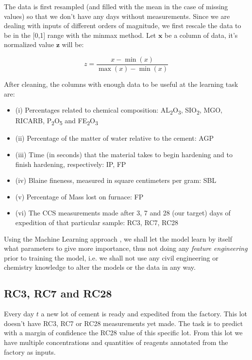 \documentclass[a4paper]{article}
\begin{document}
The data is first resampled (and filled with the mean in the case of missing values) so that we don't have any days without measurements. 
Since we are dealing with inputs of different orders of magnitude, we first rescale the data to be in the [0,1] range with the minmax method. Let  \(\textbf{x}\) be a column of data, it's 
normalized value \(\textbf{z}\) will be:


\begin{equation}
z=\frac{x-\min (x)}{\max (x)-\min (x)}
\end{equation}

After cleaning, the columns with enough data to be useful at the learning task are: 

\begin{itemize}
\item (i) Percentages related to chemical composition: AL\textsubscript{2}O\textsubscript{3}, SIO\textsubscript{2}, MGO, RICARB, P\textsubscript{2}O\textsubscript{5} and FE\textsubscript{2}O\textsubscript{3}
\item (ii) Percentage of the matter of water relative to the cement: AGP
\item (iii) Time (in seconds) that the material takes to begin hardening and to finish hardening, respectively: IP, FP
\item (iv) Blaine fineness, measured in square centimeters per gram: SBL
\item (v) Percentage of Mass lost on furnace: FP
\item (vi) The CCS measurements made after 3, 7 and 28 (our target) days of expedition of that particular sample: RC3, RC7, RC28
\end{itemize}


Using the Machine Learning approach \cite{dlbook},  we shall let the model learn by itself what parameters to give more importance, 
thus not doing any \emph{feature engineering} prior to training the model, i.e. we shall not 
use any civil engineering or chemistry knowledge to alter the models or the data in any way.

\subsection{RC3, RC7 and RC28}
\label{sec:orgfbd87b6}
Every day \(t\) a new lot of cement is ready and expedited from the factory. This lot doesn't have RC3, RC7 or RC28 measurements yet made. The task is to predict with a margin of confidence 
the RC28 value of this specific lot. From this lot we have multiple concentrations and quantities of reagents annotated from the factory as inputs.
\end{document}
